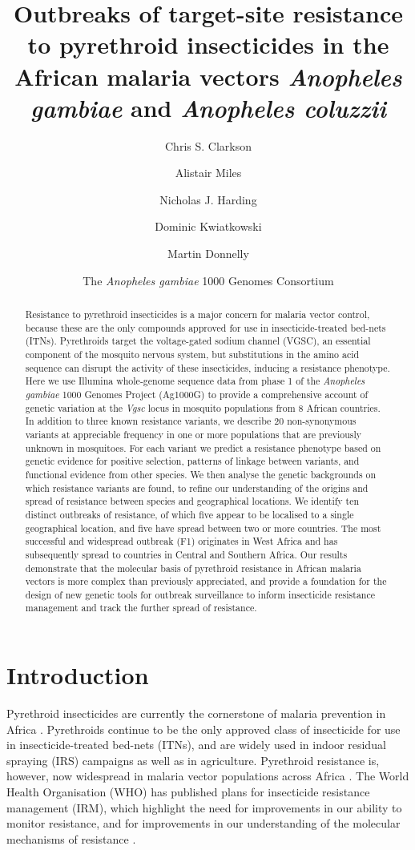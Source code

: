\documentclass[a4paper,11pt,abstracton,hidelinks]{scrartcl}
\title{
Outbreaks of target-site resistance to pyrethroid insecticides in the African malaria vectors \emph{Anopheles gambiae} and \emph{Anopheles coluzzii}
}
\author[1]{Chris S. Clarkson}
\author[2,1]{Alistair Miles}
\author[2]{Nicholas J. Harding}
\author[1,2]{Dominic Kwiatkowski}
\author[3,1]{Martin Donnelly}
\author[4]{The \emph{Anopheles gambiae} 1000 Genomes Consortium}
\affil[1]{Wellcome Trust Sanger Institute, Hinxton, Cambridge CB10 1SA}
\affil[2]{Big Data Institute, Old Road, Oxford OX3 7FZ}
\affil[3]{Liverpool School of Tropical Medicine, Pembroke Place, Liverpool L3 5QA}
\affil[4]{https://www.malariagen.net/projects/ag1000g\#people}
\begin{document}
\maketitle


\begin{abstract}


Resistance to pyrethroid insecticides is a major concern for malaria vector control, because these are the only compounds approved for use in insecticide-treated bed-nets (ITNs). 
%
Pyrethroids target the voltage-gated sodium channel (VGSC), an essential component of the mosquito nervous system, but substitutions in the amino acid sequence can disrupt the activity of these insecticides, inducing a resistance phenotype. 
%
Here we use Illumina whole-genome sequence data from phase 1 of the \emph{Anopheles gambiae} 1000 Genomes Project (Ag1000G) to provide a comprehensive account of genetic variation at the \emph{Vgsc} locus in mosquito populations from 8 African countries.
%
In addition to three known resistance variants, we describe 20 non-synonymous variants at appreciable frequency in one or more populations that are previously unknown in mosquitoes.
%
For each variant we predict a resistance phenotype based on genetic evidence for positive selection, patterns of linkage between variants, and functional evidence from other species.
%
We then analyse the genetic backgrounds on which resistance variants are found, to refine our understanding of the origins and spread of resistance between species and geographical locations.
%
We identify ten distinct outbreaks of resistance, of which five appear to be localised to a single geographical location, and five have spread between two or more countries.
%
The most successful and widespread outbreak (F1) originates in West Africa and has subsequently spread to countries in Central and Southern Africa.
%
Our results demonstrate that the molecular basis of pyrethroid resistance in African malaria vectors is more complex than previously appreciated, and provide a foundation for the design of new genetic tools for outbreak surveillance to inform insecticide resistance management and track the further spread of resistance.

\end{abstract}


\section*{Introduction}


Pyrethroid insecticides are currently the cornerstone of malaria prevention in Africa \cite{Bhatt2015}. 
%
Pyrethroids continue to be the only approved class of insecticide for use in insecticide-treated bed-nets (ITNs), and are widely used in indoor residual spraying (IRS) campaigns as well as in agriculture.
%
Pyrethroid resistance is, however, now widespread in malaria vector populations across Africa \cite{Hemingway2016}.
%
The World Health Organisation (WHO) has published plans for insecticide resistance management (IRM), which highlight the need for improvements in our ability to monitor resistance, and for improvements in our understanding of the molecular mechanisms of resistance \cite{WorldHealthOrganization2012}.
\end{document}
